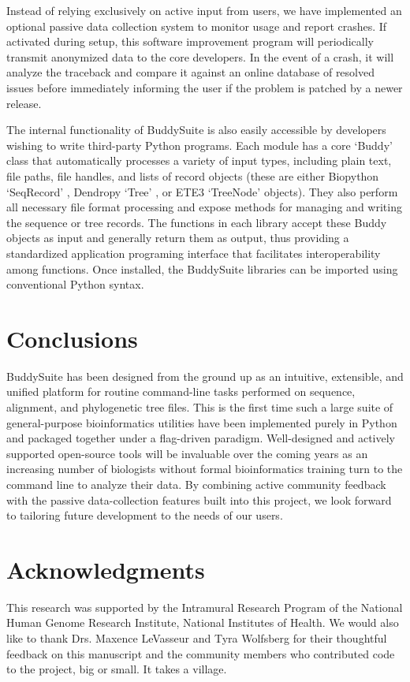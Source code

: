 \documentclass[nogrid]{MBE}%
\begin{document}
Instead of relying exclusively on active input from users, we have implemented an optional passive data collection system to monitor usage and report crashes. If activated during setup, this software improvement program will periodically transmit anonymized data to the core developers. In the event of a crash, it will analyze the traceback and compare it against an online database of resolved issues before immediately informing the user if the problem is patched by a newer release.

The internal functionality of BuddySuite is also easily accessible by developers wishing to write third-party Python programs. Each module has a core `Buddy' class that automatically processes a variety of input types, including plain text, file paths, file handles, and lists of record objects (these are either Biopython `SeqRecord' \cite{Cock:2009hj}, Dendropy `Tree' \cite{Sukumaran:2010id}, or ETE3 `TreeNode' \cite{HuertaCepas:2016hw} objects). They also perform all necessary file format processing and expose methods for managing and writing the sequence or tree records. The functions in each library accept these Buddy objects as input and generally return them as output, thus providing a standardized application programing interface that facilitates interoperability among functions. Once installed, the BuddySuite libraries can be imported using conventional Python syntax.

\section{Conclusions}
BuddySuite has been designed from the ground up as an intuitive, extensible, and unified platform for routine command-line tasks performed on sequence, alignment, and phylogenetic tree files. This is the first time such a large suite of general-purpose bioinformatics utilities have been implemented purely in Python and packaged together under a flag-driven paradigm. Well-designed and actively supported open-source tools will be invaluable over the coming years as an increasing number of biologists without formal bioinformatics training turn to the command line to analyze their data. By combining active community feedback with the passive data-collection features built into this project, we look forward to tailoring future development to the needs of our users.


\section{Acknowledgments}
This research was supported by the Intramural Research Program of the National Human Genome Research Institute, National Institutes of Health. We would also like to thank Drs. Maxence LeVasseur and Tyra Wolfsberg for their thoughtful feedback on this manuscript and the community members who contributed code to the project, big or small. It takes a village.
\end{document}
